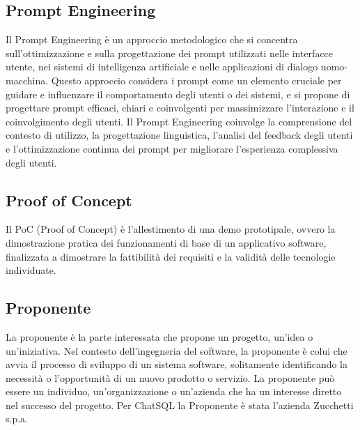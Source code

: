 \subsection*{Prompt Engineering}
Il Prompt Engineering è un approccio metodologico che si concentra sull'ottimizzazione e sulla progettazione dei prompt utilizzati nelle interfacce utente, nei sistemi di intelligenza artificiale e nelle applicazioni di dialogo uomo-macchina. Questo approccio considera i prompt come un elemento cruciale per guidare e influenzare il comportamento degli utenti o dei sistemi, e si propone di progettare prompt efficaci, chiari e coinvolgenti per massimizzare l'interazione e il coinvolgimento degli utenti. Il Prompt Engineering coinvolge la comprensione del contesto di utilizzo, la progettazione linguistica, l'analisi del feedback degli utenti e l'ottimizzazione continua dei prompt per migliorare l'esperienza complessiva degli utenti.

\vspace{2em}
\subsection*{Proof of Concept}
Il PoC (Proof of Concept) è l’allestimento di una demo prototipale, ovvero la dimostrazione pratica dei funzionamenti di base di un applicativo software, finalizzata a dimostrare la fattibilità dei requisiti e la validità delle tecnologie individuate.

\vspace{2em}
\subsection*{Proponente}
La proponente è la parte interessata che propone un progetto, un'idea o un'iniziativa. Nel contesto dell'ingegneria del software, la proponente è colui che avvia il processo di sviluppo di un sistema software, solitamente identificando la necessità o l'opportunità di un nuovo prodotto o servizio. La proponente può essere un individuo, un'organizzazione o un'azienda che ha un interesse diretto nel successo del progetto. Per ChatSQL la Proponente è stata l'azienda Zucchetti s.p.a.

\vspace{2em}
